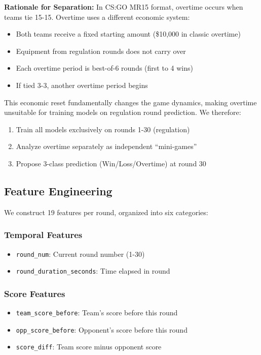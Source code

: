 \documentclass[11pt]{article}
\begin{document}
\textbf{Rationale for Separation:} In CS:GO MR15 format, overtime occurs when teams tie 15-15. Overtime uses a different economic system:
\begin{itemize}
    \item Both teams receive a fixed starting amount (\$10,000 in classic overtime)
    \item Equipment from regulation rounds does not carry over
    \item Each overtime period is best-of-6 rounds (first to 4 wins)
    \item If tied 3-3, another overtime period begins
\end{itemize}

This economic reset fundamentally changes the game dynamics, making overtime unsuitable for training models on regulation round prediction. We therefore:
\begin{enumerate}
    \item Train all models exclusively on rounds 1-30 (regulation)
    \item Analyze overtime separately as independent ``mini-games''
    \item Propose 3-class prediction (Win/Loss/Overtime) at round 30
\end{enumerate}

\subsection{Feature Engineering}

We construct 19 features per round, organized into six categories:

\subsubsection{Temporal Features}
\begin{itemize}
    \item \texttt{round\_num}: Current round number (1-30)
    \item \texttt{round\_duration\_seconds}: Time elapsed in round
\end{itemize}

\subsubsection{Score Features}
\begin{itemize}
    \item \texttt{team\_score\_before}: Team's score before this round
    \item \texttt{opp\_score\_before}: Opponent's score before this round
    \item \texttt{score\_diff}: Team score minus opponent score
\end{itemize}
\end{document}
